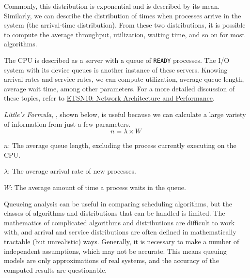 Commonly, this distribution is exponential and is described by its mean.
Similarly, we can describe the distribution of times when processes arrive in
the system (the arrival-time distribution). From these two distributions, it is
possible to compute the average throughput, utilization, waiting time, and so
on for most algorithms.

The CPU is described as a server with a queue of \texttt{READY} processes.
The I/O system with its device queues is another instance of these servers.
Knowing arrival rates and service rates, we can compute utilization, average queue length, average wait time, among other parameters.
For a more detailed discussion of these topics, refer to \href{file:./ETSN10-Network_Architecture_Performance-Reference_Material.pdf}{ETSN10: Network Architecture and Performance}.

\emph{Little's Formula}, , shown below, is useful because we can calculate a large variety of information from just a few parameters.
\begin{equation}\label{eq:Littles_Law}
  n = \lambda \times W
\end{equation}
\begin{description}[noitemsep]
\item $n$: The average queue length, excluding the process currently executing on the CPU.\@
\item $\lambda$: The average arrival rate of new processes.
\item $W$: The average amount of time a process waits in the queue.
\end{description}

Queueing analysis can be useful in comparing scheduling algorithms, but the classes of algorithms and distributions that can be handled is limited.
The mathematics of complicated algorithms and distributions are difficult to work with, and arrival and service distributions are often defined in mathematically tractable (but unrealistic) ways.
Generally, it is necessary to make a number of independent assumptions, which may not be accurate.
This means queuing models are only approximations of real systems, and the accuracy of the computed results are questionable.


